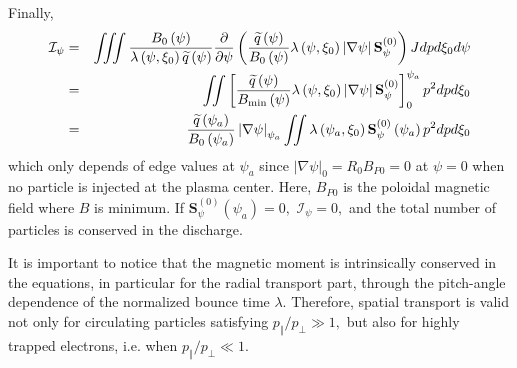 Finally,
\begin{eqnarray}
\mathcal{I}_{\psi } &=&\iiint \frac{B_{0}\left( \psi \right) }{\lambda
\left( \psi ,\xi _{0}\right) \widetilde{q}\left( \psi \right) }\frac{%
\partial }{\partial \psi }\left( \frac{\widetilde{q}\left( \psi \right) }{%
B_{0}\left( \psi \right) }\lambda \left( \psi ,\xi _{0}\right) \left| \nabla
\psi \right| \mathbf{S}_{\psi }^{\left( 0\right) }\right) Jdpd\xi _{0}d\psi
\nonumber \\
&=&\iint \left[ \frac{\widetilde{q}\left( \psi \right) }{B_{\min }\left(
\psi \right) }\lambda \left( \psi ,\xi _{0}\right) \left| \nabla \psi
\right| \mathbf{S}_{\psi }^{\left( 0\right) }\right] _{0}^{\psi
_{a}}p^{2}dpd\xi _{0}  \nonumber \\
&=&\frac{\widetilde{q}\left( \psi _{a}\right) }{B_{0}\left( \psi _{a}\right)
}\left| \nabla \psi \right| _{\psi _{a}}\iint \lambda \left( \psi _{a},\xi
_{0}\right) \mathbf{S}_{\psi }^{\left( 0\right) }\left( \psi _{a}\right)
p^{2}dpd\xi _{0}
\end{eqnarray}
which only depends of edge values at $\psi _{a}$ since $\left| \nabla \psi
\right| _{0}=R_{0}B_{P0}=0$ at $\psi =0$ when no particle is injected at the
plasma center. Here, $B_{P0}$ is the poloidal magnetic field where $B$ is
minimum. If $\mathbf{S}_{\psi }^{\left( 0\right) }\left( \psi _{a}\right) =0,
$ $\mathcal{I}_{\psi }=0,$ and the total number of particles is conserved in
the discharge.

It is important to notice that the magnetic moment is intrinsically
conserved in the equations, in particular for the radial transport part,
through the pitch-angle dependence of the normalized bounce time $\lambda .$
Therefore, spatial transport is valid not only for circulating particles
satisfying $p_{\Vert }/p_{\bot }\gg 1,$ but also for highly trapped
electrons, i.e. when $p_{\Vert }/p_{\bot }\ll 1.$
